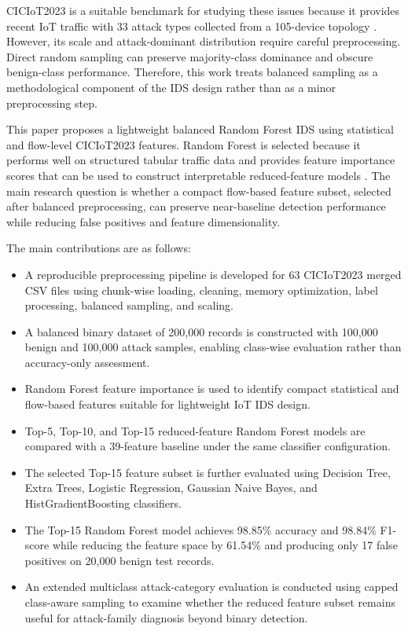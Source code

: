 \documentclass[journal]{IEEEtran}
\begin{document}
CICIoT2023 is a suitable benchmark for studying these issues because it provides recent IoT traffic with 33 attack types collected from a 105-device topology \cite{neto2023ciciot}. However, its scale and attack-dominant distribution require careful preprocessing. Direct random sampling can preserve majority-class dominance and obscure benign-class performance. Therefore, this work treats balanced sampling as a methodological component of the IDS design rather than as a minor preprocessing step.

This paper proposes a lightweight balanced Random Forest IDS using statistical and flow-level CICIoT2023 features. Random Forest is selected because it performs well on structured tabular traffic data and provides feature importance scores that can be used to construct interpretable reduced-feature models \cite{breiman2001random}. The main research question is whether a compact flow-based feature subset, selected after balanced preprocessing, can preserve near-baseline detection performance while reducing false positives and feature dimensionality.

The main contributions are as follows:
\begin{itemize}
    \item A reproducible preprocessing pipeline is developed for 63 CICIoT2023 merged CSV files using chunk-wise loading, cleaning, memory optimization, label processing, balanced sampling, and scaling.
    \item A balanced binary dataset of 200,000 records is constructed with 100,000 benign and 100,000 attack samples, enabling class-wise evaluation rather than accuracy-only assessment.
    \item Random Forest feature importance is used to identify compact statistical and flow-based features suitable for lightweight IoT IDS design.
    \item Top-5, Top-10, and Top-15 reduced-feature Random Forest models are compared with a 39-feature baseline under the same classifier configuration.
    \item The selected Top-15 feature subset is further evaluated using Decision Tree, Extra Trees, Logistic Regression, Gaussian Naive Bayes, and HistGradientBoosting classifiers.
    \item The Top-15 Random Forest model achieves 98.85\% accuracy and 98.84\% F1-score while reducing the feature space by 61.54\% and producing only 17 false positives on 20,000 benign test records.
    \item An extended multiclass attack-category evaluation is conducted using capped class-aware sampling to examine whether the reduced feature subset remains useful for attack-family diagnosis beyond binary detection.
\end{itemize}
\end{document}
